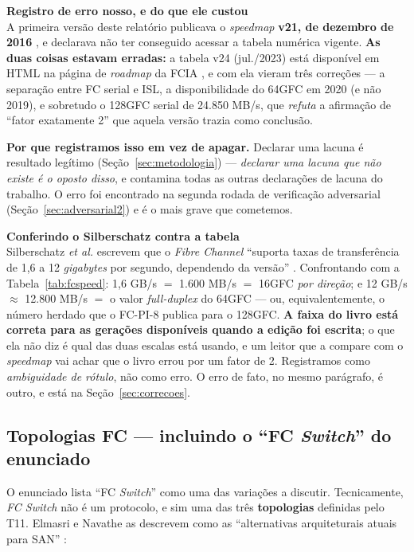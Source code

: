 \documentclass[11pt,a4paper]{article}
\newcommand{\correcao}[2]{%
  \begin{center}\begin{minipage}{0.96\textwidth}
  \colorbox{fundo}{\begin{minipage}{\dimexpr\linewidth-2\fboxsep}
  \vspace{2pt}\textbf{\color{laranja}\small #1}\\[1pt]\footnotesize #2\vspace{3pt}
  \end{minipage}}\end{minipage}\end{center}}
\begin{document}
\correcao{Registro de erro nosso, e do que ele custou}{%
A primeira versão deste relatório publicava o \textit{speedmap} \textbf{v21, de dezembro de 2016}
\cite{fciaspeedmap},
e declarava não ter conseguido acessar a tabela numérica vigente. \textbf{As duas coisas estavam
erradas:} a tabela v24 (jul./2023) está disponível em HTML na página de \textit{roadmap} da FCIA
\cite{fciaroadmap}, e com ela vieram três correções --- a separação entre FC serial e ISL, a
disponibilidade do 64GFC em 2020 (e não 2019), e sobretudo o 128GFC serial de 24.850 MB/s, que
\emph{refuta} a afirmação de ``fator exatamente 2'' que aquela versão trazia como conclusão.

\smallskip
\textbf{Por que registramos isso em vez de apagar.} Declarar uma lacuna é resultado legítimo
(Seção~\ref{sec:metodologia}) --- \emph{declarar uma lacuna que não existe é o oposto disso}, e
contamina todas as outras declarações de lacuna do trabalho. O erro foi encontrado na segunda
rodada de verificação adversarial (Seção~\ref{sec:adversarial2}) e é o mais grave que cometemos.}

\correcao{Conferindo o Silberschatz contra a tabela}{%
Silberschatz \textit{et al.} escrevem que o \textit{Fibre Channel} ``suporta taxas de transferência
de 1,6 a 12 \textit{gigabytes} por segundo, dependendo da versão'' \cite{silberschatz2020}.
Confrontando com a Tabela~\ref{tab:fcspeed}: 1,6 GB/s $=$ 1.600 MB/s $=$ 16GFC \emph{por direção}; e
12 GB/s $\approx$ 12.800 MB/s $=$ o valor \emph{full-duplex} do 64GFC --- ou, equivalentemente, o
número herdado que o FC-PI-8 publica para o 128GFC. \textbf{A faixa do livro está correta para as
gerações disponíveis quando a edição foi escrita}; o que ela não diz é qual das duas escalas está
usando, e um leitor que a compare com o \textit{speedmap} vai achar que o livro errou por um fator
de 2. Registramos como \emph{ambiguidade de rótulo}, não como erro. O erro de fato, no mesmo
parágrafo, é outro, e está na Seção~\ref{sec:correcoes}.}


\subsection{Topologias FC --- incluindo o ``FC \textit{Switch}'' do enunciado}
\label{sec:topologias}

O enunciado lista ``FC \textit{Switch}'' como uma das variações a discutir. Tecnicamente,
\textit{FC Switch} não é um protocolo, e sim uma das três \textbf{topologias} definidas pelo T11.
Elmasri e Navathe as descrevem como as ``alternativas arquiteturais atuais para SAN''
\cite{elmasri2018}:
\end{document}
